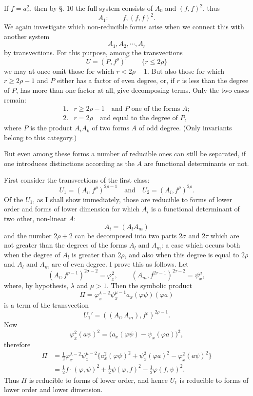 \documentclass[10pt]{article}
\providecommand{\bdots}{\cdots}
\begin{document}
If $f=a_x^2$, then by §. 10 the full system consists of $A_0$ and $(f,f)^2$, thus
\[
A_1:
\qquad f,(f,f)^2.
\]
We again investigate which non-reducible forms arise when we connect this with another system
\[
A_1,A_2,\bdots,A_r
\]
by transvections. For this purpose, among the transvections
\[
U=(P,f^\rho)^r\qquad \{r\leq 2\rho\}
\]
we may at once omit those for which $r<2\rho-1$. But also those for which $r\geq2\rho-1$ and $P$ either has a factor of even degree, or, if $r$ is less than the degree of $P$, has more than one factor at all, give decomposing terms. Only the two cases remain:
\[
\begin{array}{ll}
1.& r\geq2\rho-1\quad\text{and }P\text{ one of the forms }A;\\
2.& r=2\rho\quad\text{and equal to the degree of }P,
\end{array}
\]
where $P$ is the product $A_iA_k$ of two forms $A$ of odd degree. (Only invariants belong to this category.)

But even among these forms a number of reducible ones can still be separated, if one introduces distinctions according as the $A$ are functional determinants or not.

First consider the transvections of the first class:
\[
U_1=(A_i,f^\rho)^{2\rho-1}
\quad\text{and}\quad
U_2=(A_i,f^\rho)^{2\rho}.
\]
Of the $U_1$, as I shall show immediately, those are reducible to forms of lower order and forms of lower dimension for which $A_i$ is a functional determinant of two other, non-linear $A$:
\[
A_i=(A_lA_m)
\]
and the number $2\rho+2$ can be decomposed into two parts $2\sigma$ and $2\tau$ which are not greater than the degrees of the forms $A_l$ and $A_m$: a case which occurs both when the degree of $A_l$ is greater than $2\rho$, and also when this degree is equal to $2\rho$ and $A_l$ and $A_m$ are of even degree. I prove this as follows. Let
\[
(A_l,f^{\rho-1})^{2\sigma-2}=\varphi_x^2,
\qquad
(A_m,f^{2\tau-1})^{2\tau-2}=\psi_x^\mu,
\]
where, by hypothesis, $\lambda$ and $\mu>1$. Then the symbolic product
\[
\Pi=\varphi_x^{\lambda-2}\psi_x^{\mu-1}a_x(\varphi\psi)(\varphi a)
\]
is a term of the transvection
\[
U_1'=((A_l,A_m),f^\rho)^{2\rho-1}.
\]
Now
\[
\varphi_x^2(a\psi)^2=\bigl(a_x(\varphi\psi)-\psi_x(\varphi a)\bigr)^2,
\]
therefore
\[
\begin{aligned}
\Pi
&=\frac12\varphi_x^{\lambda-2}\psi_x^{\mu-2}\{a_x^2(\varphi\psi)^2+\psi_x^2(\varphi a)^2-\varphi_x^2(a\psi)^2\}\\
&=\frac12 f\cdot(\varphi,\psi)^2+\frac12\psi(\varphi,f)^2-
\frac12\varphi(f,\psi)^2.
\end{aligned}
\]
Thus $\Pi$ is reducible to forms of lower order, and hence $U_1$ is reducible to forms of lower order and lower dimension.
\end{document}
